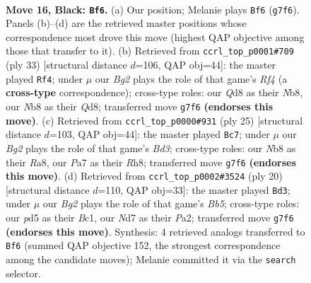 \documentclass[11pt]{article}
\begin{document}
\clearpage

\begin{figure}[p]\centering
\begin{subfigure}{0.46\textwidth}\centering
\resizebox{\linewidth}{!}{%
\newchessgame
\chessboard[
  setfen={rn1qr1k1/p2n1pb1/1p1p3P/2pP2p1/P3P1P1/2N5/1P2N3/R1BQK2R b KQ - 0 16},
  showmover=false,
  pgfstyle=straightmove, color=movearrow, markmove={g7-f6}
]}
\caption{}
\end{subfigure}\hfill
\begin{subfigure}{0.46\textwidth}\centering
\resizebox{\linewidth}{!}{%
\newchessgame
\chessboard[
  setfen={rn1q2k1/2p1b1pp/3p2n1/1p1Ppr2/PP6/4NN2/5PPP/R1BQ1RK1 b - - 1 17},
  showmover=false,
  pgfstyle=straightmove, color=movearrow, markmove={f5-f4}
]}
\caption{}
\end{subfigure}
\\[4pt]
\begin{subfigure}{0.46\textwidth}\centering
\resizebox{\linewidth}{!}{%
\newchessgame
\chessboard[
  setfen={r3k2r/pp1qn2p/2nbpp2/2Pp1p2/3P4/5N2/PP3PPP/RNBQR1K1 b kq - 0 13},
  showmover=false,
  pgfstyle=straightmove, color=movearrow, markmove={d6-c7}
]}
\caption{}
\end{subfigure}\hfill
\begin{subfigure}{0.46\textwidth}\centering
\resizebox{\linewidth}{!}{%
\newchessgame
\chessboard[
  setfen={r1bqr1k1/1p1nppbp/p4np1/1B1p4/3P4/5N1P/PPP2PP1/RNBQR1K1 w - - 0 11},
  showmover=false,
  pgfstyle=straightmove, color=movearrow, markmove={b5-d3}
]}
\caption{}
\end{subfigure}
\caption{\textbf{Move 16, Black: \texttt{Bf6}.} (a) Our position; Melanie plays \texttt{Bf6} (\texttt{g7f6}). Panels (b)--(d) are the retrieved master positions whose correspondence most drove this move (highest QAP objective among those that transfer to it). (b) Retrieved from \texttt{ccrl\_top\_p0001\#709} (ply 33) [structural distance $d$=106, QAP obj=44]: the master played \texttt{Rf4}; under $\mu$ our \emph{Bg2} plays the role of that game's \emph{Rf4} (a \textbf{cross-type} correspondence); cross-type roles: our \emph{Q}d8 as their \emph{N}b8, our \emph{N}b8 as their \emph{Q}d8; transferred move \texttt{g7f6} \textbf{(endorses this move)}. (c) Retrieved from \texttt{ccrl\_top\_p0000\#931} (ply 25) [structural distance $d$=103, QAP obj=44]: the master played \texttt{Bc7}; under $\mu$ our \emph{Bg2} plays the role of that game's \emph{Bd3}; cross-type roles: our \emph{N}b8 as their \emph{R}a8, our \emph{P}a7 as their \emph{R}h8; transferred move \texttt{g7f6} \textbf{(endorses this move)}. (d) Retrieved from \texttt{ccrl\_top\_p0002\#3524} (ply 20) [structural distance $d$=110, QAP obj=33]: the master played \texttt{Bd3}; under $\mu$ our \emph{Bg2} plays the role of that game's \emph{Bb5}; cross-type roles: our \emph{p}d5 as their \emph{B}c1, our \emph{N}d7 as their \emph{P}a2; transferred move \texttt{g7f6} \textbf{(endorses this move)}. Synthesis: 4 retrieved analogs transferred to \texttt{Bf6} (summed QAP objective 152, the strongest correspondence among the candidate moves); Melanie committed it via the \texttt{search} selector.}
\label{fig:thought-m31}
\end{figure}
\end{document}
